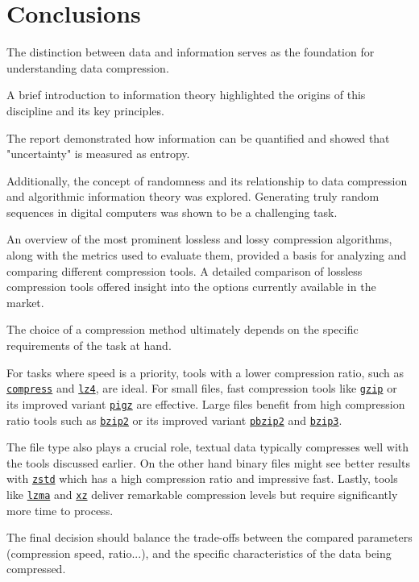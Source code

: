\documentclass[12pt, a4paper]{report}
\begin{document}
\appendix

\chapter{Conclusions}

The distinction between data and information serves as the foundation for understanding data compression.

A brief introduction to information theory highlighted the origins of this discipline and its key principles.

The report demonstrated how information can be quantified and showed that "uncertainty" is measured as entropy.

Additionally, the concept of randomness and its relationship to data compression and algorithmic information theory was explored.
Generating truly random sequences in digital computers was shown to be a challenging task.

An overview of the most prominent lossless and lossy compression algorithms, along with the metrics used to evaluate them,
provided a basis for analyzing and comparing different compression tools.
A detailed comparison of lossless compression tools offered insight into the options currently available in the market.

The choice of a compression method ultimately depends on the specific requirements of the task at hand.

For tasks where speed is a priority, tools with a lower compression ratio, such as \hyperref[subsec:compress]{\texttt{compress}}
and \hyperref[subsec:lz4]{\texttt{lz4}}, are ideal.
For small files, fast compression tools like \hyperref[subsec:gzip]{\texttt{gzip}} or its improved variant
\hyperref[subsec:gzip]{\texttt{pigz}} are effective.
Large files benefit from high compression ratio tools such as \hyperref[subsec:bzip2]{\texttt{bzip2}} or its improved variant
\hyperref[subsec:bzip2]{\texttt{pbzip2}} and \hyperref[subsec:bzip3]{\texttt{bzip3}}.

The file type also plays a crucial role, textual data typically compresses well with the tools discussed earlier.
On the other hand binary files might see better results with \hyperref[subsec:zstd]{\texttt{zstd}} which has a high compression
ratio and impressive fast.
Lastly, tools like \hyperref[subsec:lzma]{\texttt{lzma}} and \hyperref[subsec:xz]{\texttt{xz}} deliver remarkable compression
levels but require significantly more time to process.

The final decision should balance the trade-offs between the compared parameters (compression speed, ratio...), and the specific
characteristics of the data being compressed.

\printbibliography
\thispagestyle{empty}
\end{document}
